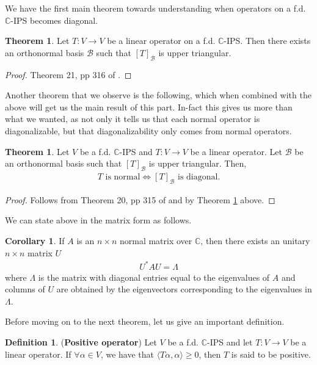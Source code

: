 \documentclass[letterpaper,11pt,twoside]{article}
\theoremstyle{definition}
\theoremstyle{definition}
\newtheorem{definition}[proposition]{Definition}
\newtheorem{theorem}[proposition]{Theorem}
\theoremstyle{definition}
\theoremstyle{definition}
\theoremstyle{definition}
\theoremstyle{definition}
\theoremstyle{remark}
\theoremstyle{definition}
\newtheorem{corollary}[proposition]{Corollary}
\newcommand{\ip}[2]{\langle #1,#2 \rangle}
\newcommand{\C}{\mathbb{C}}
\begin{document}
    We have the first main theorem towards understanding when operators on a f.d. $ \C $-IPS becomes diagonal.
    \begin{theorem}\label{T-6.0.1}
    	Let $ T : V\to V $ be a linear operator on a f.d. $ \C $-IPS. Then there exists an orthonormal basis $ \mathcal{B}$ such that $ [T]_\mathcal{B} $ is upper triangular.
    \end{theorem}
    \begin{proof}
    	Theorem 21, pp 316 of \cite{HK71}.
    \end{proof}
    Another theorem that we observe is the following, which when combined with the above will get us the main result of this part. In-fact this gives us more than what we wanted, as not only it tells us that each normal operator is diagonalizable, but that diagonalizability only comes from normal operators.
    \begin{theorem}\label{T-6.0.2}
    	Let $ V $ be a f.d. $ \C $-IPS and $ T:V\to V $ be a linear operator. Let $ \mathcal{B} $ be an orthonormal basis such that $ [T]_{\mathcal{B}} $ is upper triangular. Then,
    	\begin{align*}
    		T \text{ is normal}\iff [T]_{\mathcal{B}} \text{ is diagonal.}
      	\end{align*} 
    \end{theorem}
    \begin{proof}
    	Follows from Theorem 20, pp 315 of \cite{HK71} and by Theorem \ref{T-6.0.1} above.
    \end{proof}
	We can state above in the matrix form as follows.
	\begin{corollary}\label{C-6.0.3}
		If $ A $ is an $ n\times n $ normal matrix over $ \C $, then there exists an unitary $ n\times n $ matrix $ U $
		\begin{align*}
			U^{*}AU = \Lambda
		\end{align*}
		where $ \Lambda$ is the matrix with diagonal entries equal to the eigenvalues of $ A $ and columns of $ U $ are obtained by the eigenvectors corresponding to the eigenvalues in $ \Lambda $.
	\end{corollary}
    Before moving on to the next theorem, let us give an important definition.
    \begin{definition}
    	(\textbf{Positive operator}) Let $ V $ be a f.d. $ \C $-IPS and let $ T : V\to V$ be a linear operator. If $ \forall \alpha \in V $, we have that $ \ip{T\alpha}{\alpha} \ge 0 $, then $ T $ is said to be positive.
    \end{definition}
\end{document}
